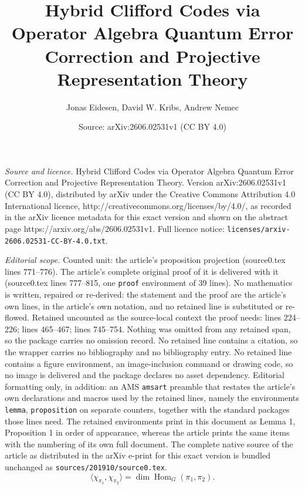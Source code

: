 \documentclass[10pt,a4paper]{amsart}
\title{Hybrid Clifford Codes via Operator Algebra Quantum Error Correction and Projective Representation Theory}
\author{Jonas Eidesen, David W. Kribs, Andrew Nemec}
\date{Source: arXiv:2606.02531v1 (CC BY 4.0)}
\newcommand{\Hom}{\operatorname{Hom}}
\begin{document}
\maketitle

\noindent\emph{Source and licence.} Hybrid Clifford Codes via Operator Algebra Quantum Error Correction and Projective Representation Theory. Version arXiv:2606.02531v1 (CC BY 4.0), distributed by arXiv under the Creative Commons Attribution 4.0 International licence, http://creativecommons.org/licenses/by/4.0/, as recorded in the arXiv licence metadata for this exact version and shown on the abstract page https://arxiv.org/abs/2606.02531v1. Full licence notice: \texttt{licenses/arxiv-2606.02531-CC-BY-4.0.txt}.\par\smallskip

\noindent\textit{Editorial scope.} Counted unit: the article's proposition projection (source0.tex lines 771--776). The article's complete original proof of it is delivered with it (source0.tex lines 777--815, one \texttt{proof} environment of 39 lines). No mathematics is written, repaired or re-derived: the statement and the proof are the article's own lines, in the article's own notation, and no retained line is substituted or re-flowed.  Retained uncounted as the source-local context the proof needs: lines 224--226; lines 465--467; lines 745--754.  Nothing was omitted from any retained span, so the package carries no omission record.  No retained line contains a citation, so the wrapper carries no bibliography and no bibliography entry.  No retained line contains a figure environment, an image-inclusion command or drawing code, so no image is delivered and the package declares no asset dependency.  Editorial formatting only, in addition: an AMS \texttt{amsart} preamble that restates the article's own declarations and macros used by the retained lines, namely the environments \texttt{lemma}, \texttt{proposition} on separate counters, together with the standard packages those lines need.  The retained environments print in this document as Lemma 1, Proposition 1 in order of appearance, whereas the article prints the same items with the numbering of its own full document.  The complete native source of the article as distributed in the arXiv e-print for this exact version is bundled unchanged as \texttt{sources/201910/source0.tex}.
\begin{equation}\label{eqn:inner porduct of characters}
    \langle \chi_{\pi_1}, \chi_{\pi_2} \rangle = \dim \Hom_G(\pi_1,\pi_2).
\end{equation}
\end{document}
